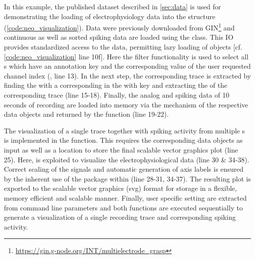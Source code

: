 In this example, the published dataset described in \cref{sec:data} is used for demonstrating the loading of electrophysiology data into the  structure (\cref{code:neo_visualization}). Data were previously downloaded from GIN\footnote{\url{https://gin.g-node.org/INT/multielectrode_grasp}} and continuous as well as sorted spiking data are loaded using the   class. This IO provides standardized access to the data, permitting lazy loading of  objects [cf. \cref{code:neo_visualization} line 10f]. Here the  filter functionality is used to select all s which have an annotation key  and the corresponding value of the user requested channel index (, line 13). In the next step, the corresponding  trace is extracted by finding the  with a corresponding in the  with key  and extracting the  of the corresponding trace (line 15-18). Finally, the analog and spiking data of 10 seconds of recording are loaded into memory via the  mechanism of the respective data objects and returned by the  function (line 19-22).

The visualization of a single  trace together with spiking activity from multiple s is implemented in the  function. This requires the corresponding data objects as input as well as a location to store the final scalable vector graphics plot (line 25). Here,  \citep{Hunter_2007} is exploited to visualize the electrophysiological data (line 30 \& 34-38). Correct scaling of the signals and automatic generation of axis labels is ensured by the inherent use of the  package within  (line 28-31, 34-37). The resulting plot is exported to the scalable vector graphics (svg) format for storage in a flexible, memory efficient and scalable manner. Finally, user specific setting are extracted from command line parameters and both functions are executed sequentially to generate a visualization of a single recording trace and corresponding spiking activity.




